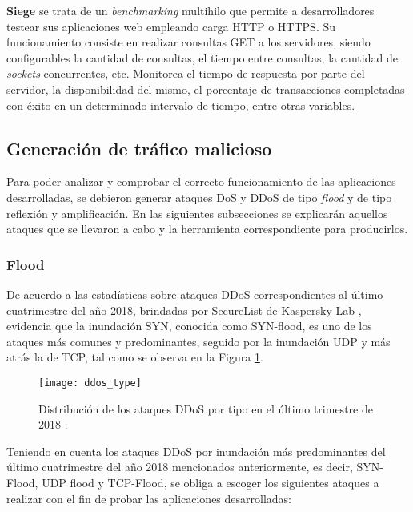 \textbf{Siege} se trata de un \textit{benchmarking} multihilo que permite a
desarrolladores testear sus aplicaciones web empleando carga HTTP o HTTPS. Su
funcionamiento consiste en realizar consultas GET a los servidores, siendo
configurables la cantidad de consultas, el tiempo entre consultas, la cantidad
de \textit{sockets} concurrentes, etc. Monitorea el tiempo de respuesta por
parte del servidor, la disponibilidad del mismo, el porcentaje de transacciones
completadas con éxito en un determinado intervalo de tiempo, entre otras
variables. %


\subsection{Generación de tráfico malicioso}
Para poder analizar y comprobar el correcto funcionamiento de las aplicaciones
desarrolladas, se debieron generar ataques DoS y DDoS de tipo \textit{flood} y
de tipo reflexión y amplificación. En las siguientes subsecciones se explicarán
aquellos ataques que se llevaron a cabo y la herramienta correspondiente para
producirlos.

\subsubsection * {Flood} \label{sec:flood}

De acuerdo a las estadísticas sobre ataques DDoS correspondientes al último
cuatrimestre del año 2018, brindadas por SecureList de Kaspersky
Lab \parencite{ref_kalpesky}, evidencia que la inundación SYN, conocida como
SYN-flood, es uno de los ataques más comunes y predominantes, seguido
por la inundación UDP y más atrás la de TCP, tal como se observa en la Figura
\ref{fig:statistics}.

\begin{figure}[!]
	\centering 
	\texttt{[image: ddos\_type]}
	\caption[Distribución de los ataques DDoS por tipo en el último trimestre de
    2018]{Distribución de los ataques DDoS por tipo en el último trimestre de
    2018 \parencite{ref_kalpesky}.}
	\label{fig:statistics}
\end{figure}

Teniendo en cuenta los ataques DDoS por inundación más predominantes del último
cuatrimestre del año 2018 mencionados anteriormente, es decir, SYN-Flood, UDP
flood y TCP-Flood, se obliga a escoger los siguientes ataques a realizar con el
fin de probar las aplicaciones desarrolladas:


